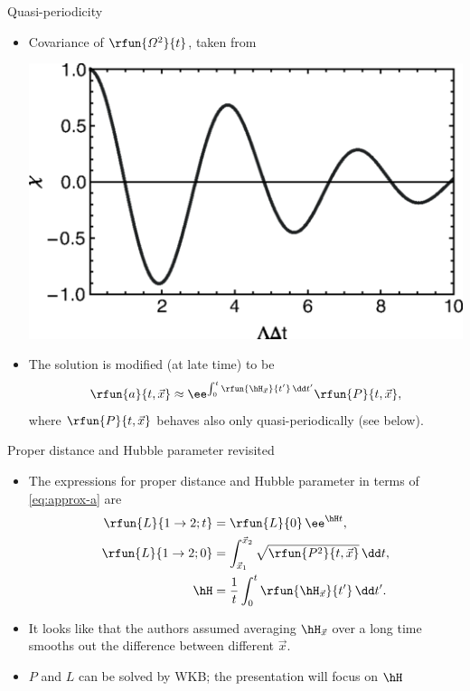 \documentclass{beamer}
\begin{document}
\begin{frame}{Quasi-periodicity}
\begin{itemize}
\item Covariance of $\rfun{\varOmega^2}{t}$, taken from \cite{Wang2017}
\begin{center}
\includegraphics[width=.6\linewidth]{./graphics/FIG.2.png}
\end{center}
\item The solution is modified (at late time) to be
\begin{equation}
\rfun{a}{t,\vec x} \approx \ee^{\int_0^t \rfun{\hH_{\vec x}}{t'}\,\dd t'}
\rfun{P}{t,\vec x},
\label{eq:approx-a}
\end{equation}
where $\rfun{P}{t,\vec x}$ behaves also only quasi-periodically (see below).

\end{itemize}

\end{frame}

\begin{frame}{Proper distance and Hubble parameter revisited}
\begin{itemize}
\item The expressions for proper distance and Hubble parameter in terms of 
\cref{eq:approx-a} are
\begin{align}
\rfun{L}{1 \to 2; t} &= \rfun{L}{0}\,\ee^{\hH t},\\
\rfun{L}{1 \to 2; 0} &= \int_{\vec x_1}^{\vec x_2} \sqrt{\rfun{P^2}{t,\vec 
x}}\,\dd t,\\
\hH &= \frac{1}{t} \int_0^t \rfun{\hH_{\vec x}}{t'}\,\dd t'.
\end{align}
\item It looks like that the authors assumed averaging $\hH_{\vec x}$ over a 
long time smooths out the difference between different $\vec x$.

\item $P$ and $L$ can be solved by WKB; the presentation will focus on $\hH$
\end{itemize}

\end{frame}
\end{document}
